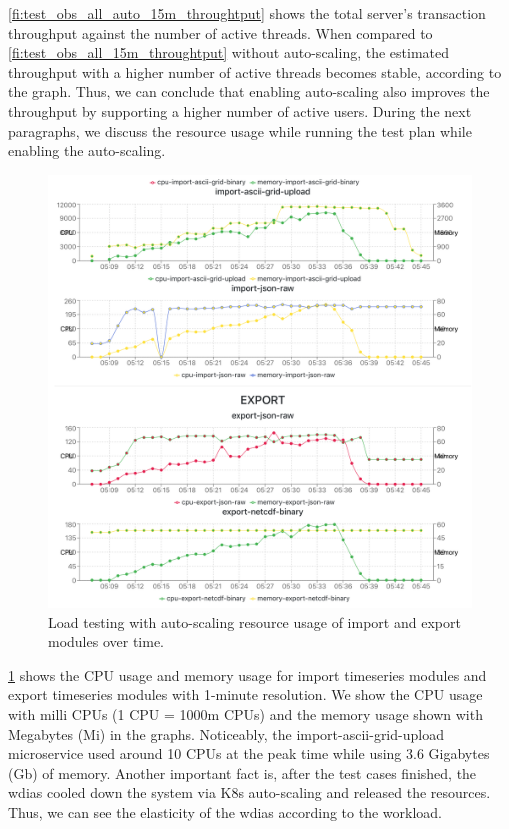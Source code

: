 \cref{fi:test_obs_all_auto_15m_throughtput} shows the total server's transaction throughput against the number of active threads. When compared to \cref{fi:test_obs_all_15m_throughtput} without auto-scaling, the estimated throughput with a higher number of active threads becomes stable, according to the graph. Thus, we can conclude that enabling auto-scaling also improves the throughput by supporting a higher number of active users. During the next paragraphs, we discuss the resource usage while running the test plan while enabling the auto-scaling.

\begin{figure}[htp]
    \centering
    \includegraphics[width=1.0\textwidth]{results/obs/all_auto/obs_all_auto_15m_import_export_res.png}
    \caption{Load testing with auto-scaling resource usage of import and export modules over time.}
    \label{fi:obs_all_auto_15m_import_export_res}
\end{figure}

\cref{fi:obs_all_auto_15m_import_export_res} shows the CPU usage and memory usage for import timeseries modules and export timeseries modules with 1-minute resolution. We show the CPU usage with milli CPUs \cite{LinuxFoundationKubernetes:Containers} (1 CPU = 1000m CPUs) and the memory usage shown with Megabytes (Mi) \cite{LinuxFoundationKubernetes:Containers} in the graphs. Noticeably, the import-ascii-grid-upload microservice used around 10 CPUs at the peak time while using 3.6 Gigabytes (Gb) of memory. Another important fact is, after the test cases finished, the \acrshort{wdias} cooled down the system via K8s auto-scaling and released the resources. Thus, we can see the elasticity of the \acrshort{wdias} according to the workload.

